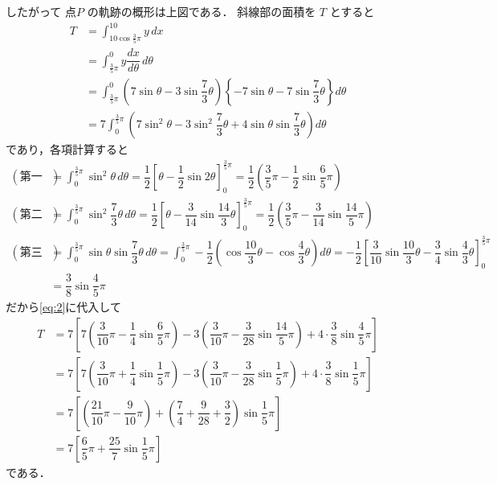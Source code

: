 \documentclass[../../main.tex]{subfiles}
\begin{document}
したがって 点$P$ の軌跡の概形は上図である．
斜線部の面積を $T$ とすると
\begin{align}
  T
  &= \int_{10\cos\frac{3}{5}\pi}^{10} y \, dx \\
  &= \int_{\frac{3}{5}\pi}^0 y \dfrac{dx}{d\theta} \, d\theta \\
  &= \int_{\frac{3}{5}\pi}^0 \left( 7\sin\theta - 3\sin\dfrac{7}{3}\theta \right) \left\{ -7\sin\theta - 7\sin\dfrac{7}{3}\theta \right\} d\theta \\
  &= 7 \int_0^{\frac{3}{5}\pi} \left( 7\sin^2\theta - 3\sin^2\dfrac{7}{3}\theta + 4\sin\theta\sin\dfrac{7}{3}\theta \right) d\theta \label{eq:2}
\end{align}
であり，各項計算すると
\begin{align}
  (\text{第一項})
  &= \int_0^{\frac{3}{5}\pi} \sin^2\theta \, d\theta
  = \dfrac{1}{2} \left[ \theta - \dfrac{1}{2}\sin 2\theta \right]_0^{\frac{3}{5}\pi}
  = \dfrac{1}{2} \left( \dfrac{3}{5}\pi - \dfrac{1}{2}\sin\dfrac{6}{5}\pi \right) \\
  (\text{第二項})
  &= \int_0^{\frac{3}{5}\pi} \sin^2\dfrac{7}{3}\theta \, d\theta
  = \dfrac{1}{2} \left[ \theta - \dfrac{3}{14}\sin\dfrac{14}{3}\theta \right]_0^{\frac{3}{5}\pi}
  = \dfrac{1}{2} \left( \dfrac{3}{5}\pi - \dfrac{3}{14}\sin\dfrac{14}{5}\pi \right) \\
  (\text{第三項})
  &= \int_0^{\frac{3}{5}\pi} \sin\theta\sin\dfrac{7}{3}\theta \, d\theta
  = \int_0^{\frac{3}{5}\pi} -\dfrac{1}{2} \left( \cos\dfrac{10}{3}\theta - \cos\dfrac{4}{3}\theta \right) d\theta
  = -\dfrac{1}{2} \left[ \dfrac{3}{10}\sin\dfrac{10}{3}\theta - \dfrac{3}{4}\sin\dfrac{4}{3}\theta \right]_0^{\frac{3}{5}\pi} \\
  &= \dfrac{3}{8}\sin\dfrac{4}{5}\pi
\end{align}
だから\cref{eq:2}に代入して
\begin{align}
  T
  &= 7 \left[ 7 \left( \dfrac{3}{10}\pi - \dfrac{1}{4}\sin\dfrac{6}{5}\pi \right) - 3 \left( \dfrac{3}{10}\pi - \dfrac{3}{28}\sin\dfrac{14}{5}\pi \right) + 4 \cdot \dfrac{3}{8}\sin\dfrac{4}{5}\pi \right] \\
  &= 7 \left[ 7 \left( \dfrac{3}{10}\pi + \dfrac{1}{4}\sin\dfrac{1}{5}\pi \right) - 3 \left( \dfrac{3}{10}\pi - \dfrac{3}{28}\sin\dfrac{1}{5}\pi \right) + 4 \cdot \dfrac{3}{8}\sin\dfrac{1}{5}\pi \right] \\
  &= 7 \left[\left( \dfrac{21}{10}\pi - \dfrac{9}{10}\pi\right) + \left(\dfrac{7}{4} + \dfrac{9}{28} + \dfrac{3}{2}\right) \sin\dfrac{1}{5}\pi \right] \\
  &= 7 \left[ \dfrac{6}{5}\pi + \dfrac{25}{7}\sin\dfrac{1}{5}\pi \right] \label{eq:3}
\end{align}
である．
\end{document}
